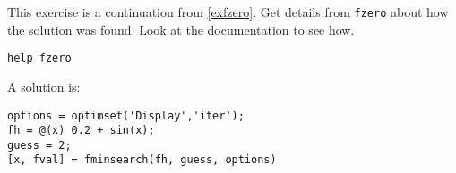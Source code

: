 \begin{ex}
This exercise is a continuation from \ref{exfzero}.
Get details from \verb!fzero! about how the solution was found.
Look at the documentation to see how.
\begin{hint}
\begin{lstlisting}
help fzero
\end{lstlisting}
\end{hint}
\begin{sol}
A solution is:
\begin{lstlisting}
options = optimset('Display','iter');
fh = @(x) 0.2 + sin(x);
guess = 2;
[x, fval] = fminsearch(fh, guess, options)
\end{lstlisting}
\end{sol}
\end{ex}
 